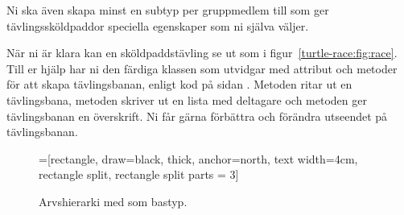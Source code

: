 \noindent Ni ska även skapa minst en subtyp per gruppmedlem till  som ger tävlingssköldpaddor speciella egenskaper som ni själva väljer.

När ni är klara kan en sköldpaddstävling se ut som i figur~\ref{turtle-race:fig:race}.
Till er hjälp har ni den färdiga klassen  som utvidgar  med attribut och metoder för att skapa tävlingsbanan, enligt kod på sidan \pageref{turtle-race:RaceWindow}. Metoden  ritar ut en tävlingsbana, metoden  skriver ut en lista med deltagare och metoden  ger tävlingsbanan en överskrift. Ni får gärna förbättra och förändra utseendet på tävlingsbanan.

\begin{figure}
\begin{center}
\newcommand{\TextBox}[1]{\raisebox{0pt}[1em][0.5em]{#1}}
=[rectangle, draw=black,  thick, anchor=north, text width=4cm, rectangle split, rectangle split parts = 3]
\end{center}
\caption{Arvshierarki med  som bastyp.}
\label{turtle-race:fig:uml-diagram1}
\end{figure}




